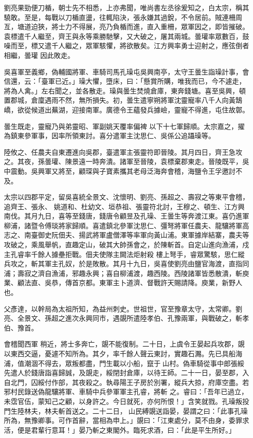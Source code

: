 \begin{pinyinscope}
 劉亮果勁便刀楯，朝士先不相悉，上亦弗聞，唯尚書左丞徐爰知之，白太宗，稱其驍敢。至是，每戰以刀楯直盪，往輒陷決，張永嫌其過銳，不令居前。賊連柵周亙，塘道迫狹，將士力不得展，亮乃負楯而進，直入重柵，眾軍因之，即皆摧破。袁標遣千人繼至，齊王與永等乘勝馳擊，又大破之，屠其兩城。曇瓘率眾數百，鼓噪而至，標又遣千人繼之，眾軍駭懼，將欲散矣。江方興率勇士迎射之，應弦倒者相繼，曇瓘
 因此敗走。



 吳喜軍至義鄉，偽輔國將軍、車騎司馬孔璪屯吳興南亭，太守王曇生詣璪計事，會信還，云：「臺軍已近。」璪大懼，墮床，曰：「懸賞所購，唯我而已，今不遽走，將為人禽。」左右聞之，並各散走。璪與曇生焚燒倉庫，東奔錢塘。喜至吳興，頓置郡城，倉廩遇雨不然，無所損失。初，曇生遣寧朔將軍沈靈寵率八千人向黃鵠嶠，欲從候道出蕪湖，迎接南軍。廣德令王蘊發兵據嶮，靈寵不得進，屯住故鄣。



 曇生既走，靈寵乃與弟靈昭、軍副姚天覆率偏裨
 以下十七軍歸順。太宗嘉之，擢為鎮東參軍事，因率所領東討。喜分遣軍主沈思仁、吳係公追躡璪等。



 陸攸之、任農夫自東遷進向吳郡，臺遣軍主張靈符即晉陵。其月四日，齊王急攻之。其夜，孫曇瓘、陳景遠一時奔潰。諸軍至晉陵，袁標棄郡東走。晉陵既平，吳中震動。吳興軍又將至，顧琛與子寶素攜其老母泛海奔會稽，海鹽令王孚邀討不及。



 太宗以四郡平定，留吳喜統全景文、沈懷明、劉亮、孫超之、壽寂之等東平會稽，追齊王、張永、
 姚道和、杜幼文、垣恭祖、張靈符北討，王穆之、頓生、江方興南伐。其月九日，喜等至錢唐，錢唐令顧昱及孔璪、王曇生等奔渡江東。喜仍進軍柳浦，諸暨令傅琰將家歸順。喜遣鎮北參軍沈思仁、彊弩將軍任農夫、龍驤將軍高志之、南臺御史阮佃夫、揚武將軍盧僧澤等率軍向黃山浦。東軍據岸結寨，農夫等攻破之，乘風舉帆，直趣定山，破其大帥孫會之，於陳斬首。自定山進向漁浦，戍主孔睿率千餘人據壘拒戰。佃夫使隊主闕法炬射殺
 樓上弩手，睿眾驚駭，思仁縱兵攻之，斬其軍主孔奴，於是敗散。其月十九日，吳喜使劉亮由鹽官海渡，直指同浦；壽寂之濟自漁浦，邪趣永興；喜自柳浦渡，趣西陵。西陵諸軍皆悉散潰，斬庾業、顧法直、吳恭，傳首京都。東軍主卜道濟、督戰許天賜請降。庾業，新野人也。



 父彥達，以幹局為太祖所知，為益州刺史。世祖世，官至豫章太守，太常卿。劉亮、全景文、孫超之進次永興同市，遇覬所遣陸孝伯、孔豫兩軍，與戰破之，斬孝伯、豫首。



 會稽聞西軍
 稍近，將士多奔亡，覬不能復制。二十日，上虞令王晏起兵攻郡，覬以東西交逼，憂遽不知所為。其夕，率千餘人聲云東討，實趣石瀃。先已具船海浦，值潮涸不得去，眾叛都盡，門生載以小船，竄于山村。偽車騎從事中郎張綏先遣人於錢唐詣喜歸誠，及覬走，綏閉封倉庫，以待王師。二十一日，晏至郡，入自北門，囚綏付作部，其夜殺之。執尋陽王子房於別署，縱兵大掠，府庫空盡。若邪村民錄送偽龍驤將軍、車騎中兵參軍軍主孔睿，將斬
 之。睿曰：「吾年已過立，未霑官伍，蒙知己之顧，以身許之。今日就死，亦何所恨！」含笑就戮。孔璪叛投門生陸林夫，林夫斬首送之。二十二日，山民縛覬送詣晏，晏謂之曰：「此事孔璪所為，無豫卿事。可作首辭，當相為申上。」覬曰：「江東處分，莫不由身，委罪求活，便是君輩行意耳！」晏乃斬之東閣外。臨死求酒，曰：「此是平生所好。」




\end{pinyinscope}
